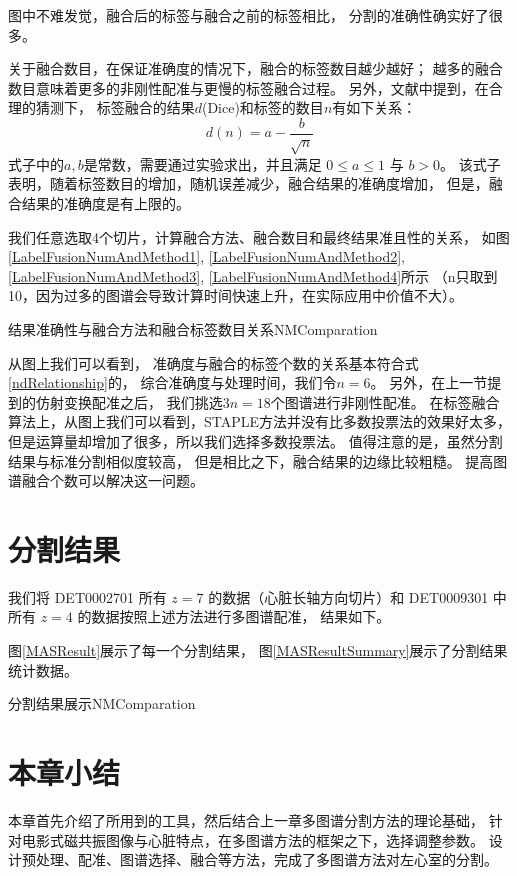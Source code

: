 图中不难发觉，融合后的标签与融合之前的标签相比，
分割的准确性确实好了很多。

关于融合数目，在保证准确度的情况下，融合的标签数目越少越好；
越多的融合数目意味着更多的非刚性配准与更慢的标签融合过程。
另外，文献\cite{HeckemannMultiClassifier2006}中提到，在合理的猜测下，
标签融合的结果$d$(Dice)和标签的数目$n$有如下关系：
\begin{equation}\label{ndRelationship}
  d(n)=a-\frac{b}{\sqrt{n}}
\end{equation}
式子中的$a,b$是常数，需要通过实验求出，并且满足 $0\le a\le 1$ 与 $b>0$。
该式子表明，随着标签数目的增加，随机误差减少，融合结果的准确度增加，
但是，融合结果的准确度是有上限的。

我们任意选取4个切片，计算融合方法、融合数目和最终结果准且性的关系，
如图\ref{LabelFusionNumAndMethod1}, \ref{LabelFusionNumAndMethod2},
\ref{LabelFusionNumAndMethod3}, \ref{LabelFusionNumAndMethod4}所示
（n只取到10，因为过多的图谱会导致计算时间快速上升，在实际应用中价值不大）。
\begin{pics}[htbp]{结果准确性与融合方法和融合标签数目关系}{NMComparation}
\end{pics}

从图上我们可以看到，
准确度与融合的标签个数的关系基本符合式\ref{ndRelationship}的，
综合准确度与处理时间，我们令$n=6$。
另外，在上一节提到的仿射变换配准之后，
我们挑选$3n=18$个图谱进行非刚性配准。
在标签融合算法上，从图上我们可以看到，STAPLE方法并没有比多数投票法的效果好太多，
但是运算量却增加了很多，所以我们选择多数投票法。
值得注意的是，虽然分割结果与标准分割相似度较高，
但是相比之下，融合结果的边缘比较粗糙。
提高图谱融合个数可以解决这一问题。


\section{分割结果}
我们将 DET0002701 所有 $z=7$ 的数据（心脏长轴方向切片）和 
DET0009301 中所有 $z=4$ 的数据按照上述方法进行多图谱配准，
结果如下。

图\ref{MASResult}展示了每一个分割结果，
图\ref{MASResultSummary}展示了分割结果统计数据。
\begin{pics}[htbp]{分割结果展示}{NMComparation}
\end{pics}

\section{本章小结}
本章首先介绍了所用到的工具，然后结合上一章多图谱分割方法的理论基础，
针对电影式磁共振图像与心脏特点，在多图谱方法的框架之下，选择调整参数。
设计预处理、配准、图谱选择、融合等方法，完成了多图谱方法对左心室的分割。
